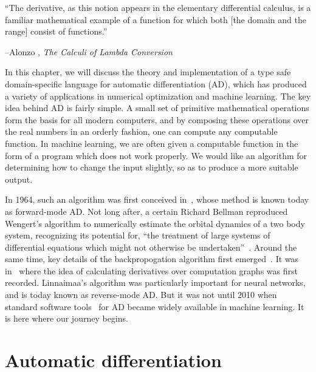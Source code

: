 \documentclass[12pt,initial,twoside,maitrise]{dms}
\numberwithin{equation}{section}
\numberwithin{table}{chapter}
\numberwithin{figure}{chapter}
\begin{document}
\setlength{\epigraphwidth}{0.7\textwidth}
\epigraph{``The derivative, as this notion appears in the elementary differential calculus, is a familiar mathematical example of a function for which both [the domain and the range] consist of functions.''}{\begin{flushright}--Alonzo \citet{church1985calculi}, \textit{The Calculi of Lambda Conversion}\end{flushright}}

In this chapter, we will discuss the theory and implementation of a type safe domain-specific language for automatic differentiation (AD), which has produced a variety of applications in numerical optimization and machine learning. The key idea behind AD is fairly simple. A small set of primitive mathematical operations form the basis for all modern computers, and by composing these operations over the real numbers in an orderly fashion, one can compute any computable function. In machine learning, we are often given a computable function in the form of a program which does not work properly. We would like an algorithm for determining how to change the input slightly, so as to produce a more suitable output.

In 1964, such an algorithm was first conceived in~\citet{wengert1964simple}, whose method is known today as forward-mode AD. Not long after, a certain Richard Bellman reproduced Wengert's algorithm to numerically estimate the orbital dynamics of a two body system, recognizing its potential for, ``the treatment of large systems of differential equations which might not otherwise be undertaken''~\citep{bellman1965wengert}. Around the same time, key details of the backpropogation algorithm first emerged~\citep{dreyfus1990artificial}. It was in~\citet{linnainmaa1970representation} where the idea of calculating derivatives over computation graphs was first recorded. Linnaimaa's algorithm was particularly important for neural networks, and is today known as reverse-mode AD. But it was not until 2010 when standard software tools~\citep{bergstra2010theano} for AD became widely available in machine learning. It is here where our journey begins.

\section{Automatic differentiation}\label{sec:automatic-differentiation}
\end{document}
